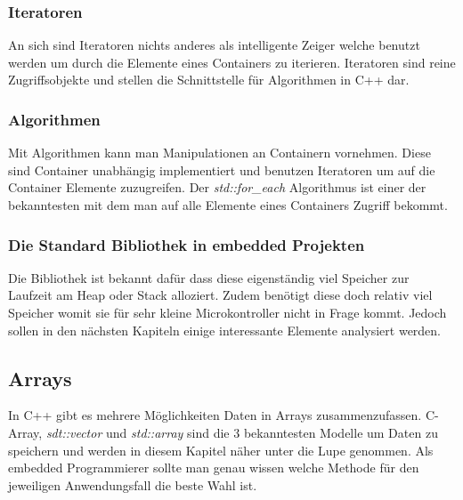 \documentclass[MES,Master,ngerman]{twbook}%
\begin{document}
\subsubsection{Iteratoren}
An sich sind Iteratoren nichts anderes als intelligente Zeiger welche benutzt werden um durch die Elemente eines Containers zu iterieren. Iteratoren sind reine Zugriffsobjekte und stellen die Schnittstelle für Algorithmen in C++ dar.
\subsubsection{Algorithmen}
Mit Algorithmen kann man Manipulationen an Containern vornehmen. Diese sind Container unabhängig implementiert und benutzen Iteratoren um auf die Container Elemente zuzugreifen. Der \textit{std::for\_each} Algorithmus ist einer der bekanntesten mit dem man auf alle Elemente eines Containers Zugriff bekommt.
\subsubsection{Die Standard Bibliothek in embedded Projekten}
Die Bibliothek ist bekannt dafür dass diese eigenständig viel Speicher zur Laufzeit am Heap oder Stack alloziert. Zudem benötigt diese doch relativ viel Speicher womit sie für sehr kleine Microkontroller nicht in Frage kommt. Jedoch sollen in den nächsten Kapiteln einige interessante Elemente analysiert werden.
\newpage

\subsection{Arrays}
In C++ gibt es mehrere Möglichkeiten Daten in Arrays zusammenzufassen. C-Array, \textit{sdt::vector} und \textit{std::array} sind die 3 bekanntesten Modelle um Daten zu speichern und werden in diesem Kapitel näher unter die Lupe genommen. Als embedded Programmierer sollte man genau wissen welche Methode für den jeweiligen Anwendungsfall die beste Wahl ist.
\end{document}
